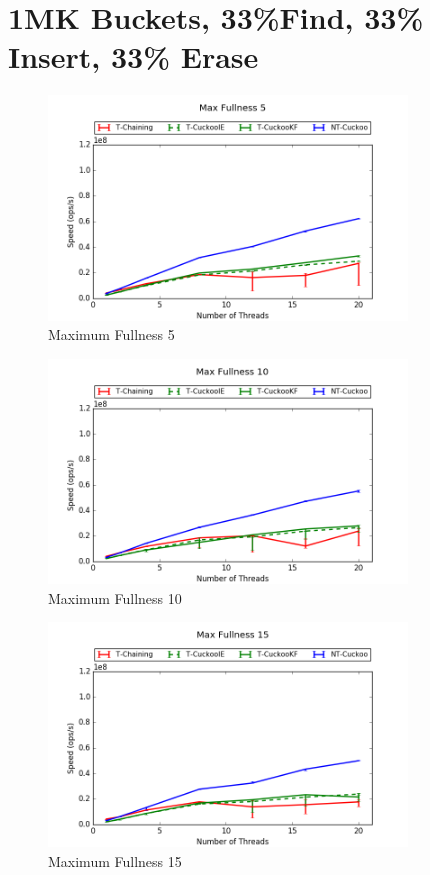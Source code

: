 \section{1MK Buckets, 33\%Find, 33\% Insert, 33\% Erase}
\begin{figure}[H]
    \centering
	\includegraphics[width=0.85\textwidth]{maps/5HM1M:F34,I33,E33.png} 
        \caption*{Maximum Fullness 5}
\end{figure}
\begin{figure}[H]
    \centering
	\includegraphics[width=0.85\textwidth]{maps/10HM1M:F34,I33,E33.png} 
        \caption*{Maximum Fullness 10}
\end{figure}
\begin{figure}[H]
    \centering
	\includegraphics[width=0.85\textwidth]{maps/15HM1M:F34,I33,E33.png} 
        \caption*{Maximum Fullness 15}
\end{figure}


